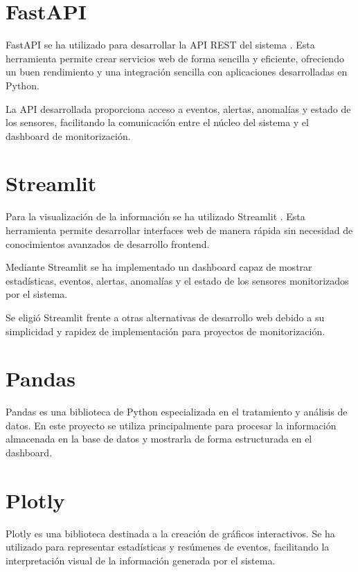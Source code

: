 \section{FastAPI}

FastAPI se ha utilizado para desarrollar la API REST del sistema \cite{fastapi}. Esta herramienta permite crear servicios web de forma sencilla y eficiente, ofreciendo un buen rendimiento y una integración sencilla con aplicaciones desarrolladas en Python.

La API desarrollada proporciona acceso a eventos, alertas, anomalías y estado de los sensores, facilitando la comunicación entre el núcleo del sistema y el dashboard de monitorización.

\section{Streamlit}

Para la visualización de la información se ha utilizado Streamlit \cite{streamlit}. Esta herramienta permite desarrollar interfaces web de manera rápida sin necesidad de conocimientos avanzados de desarrollo frontend.

Mediante Streamlit se ha implementado un dashboard capaz de mostrar estadísticas, eventos, alertas, anomalías y el estado de los sensores monitorizados por el sistema.

Se eligió Streamlit frente a otras alternativas de desarrollo web debido a su simplicidad y rapidez de implementación para proyectos de monitorización.

\section{Pandas}

Pandas\cite{pandas} es una biblioteca de Python especializada en el tratamiento y análisis de datos. En este proyecto se utiliza principalmente para procesar la información almacenada en la base de datos y mostrarla de forma estructurada en el dashboard.

\section{Plotly}

Plotly \cite{plotly} es una biblioteca destinada a la creación de gráficos interactivos. Se ha utilizado para representar estadísticas y resúmenes de eventos, facilitando la interpretación visual de la información generada por el sistema.

